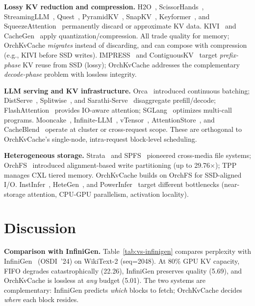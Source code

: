 \documentclass[conference]{IEEEtran}
\begin{document}
\textbf{Lossy KV reduction and compression.}
H2O~\cite{h2o}, ScissorHands~\cite{scissorhands}, StreamingLLM~\cite{streamingllm}, Quest~\cite{quest}, PyramidKV~\cite{pyramidkv}, SnapKV~\cite{snapkv}, Keyformer~\cite{keyformer}, and SqueezeAttention~\cite{squeezeattention} permanently discard or approximate KV data. KIVI~\cite{kivi} and CacheGen~\cite{cachegen} apply quantization/compression. All trade quality for memory; OrchKvCache \emph{migrates} instead of discarding, and can compose with compression (e.g., KIVI before SSD writes). IMPRESS~\cite{impress} and ContiguousKV~\cite{contiguouskv} target \emph{prefix-phase} KV reuse from SSD (lossy); OrchKvCache addresses the complementary \emph{decode-phase} problem with lossless integrity.

\textbf{LLM serving and KV infrastructure.}
Orca~\cite{orca} introduced continuous batching; DistServe~\cite{distserve}, Splitwise~\cite{splitwise}, and Sarathi-Serve~\cite{sarathi} disaggregate prefill/decode; FlashAttention~\cite{flashattn,flashattn2} provides IO-aware attention; SGLang~\cite{sglang} optimizes multi-call programs. Mooncake~\cite{mooncake}, Infinite-LLM~\cite{infinitellm}, vTensor~\cite{vtensor}, AttentionStore~\cite{attentionstore}, and CacheBlend~\cite{cacheblend} operate at cluster or cross-request scope. These are orthogonal to OrchKvCache's single-node, intra-request block-level scheduling.

\textbf{Heterogeneous storage.}
Strata~\cite{strata} and SPFS~\cite{spfs} pioneered cross-media file systems; OrchFS~\cite{orchfs} introduced alignment-based write partitioning (up to 29.76$\times$); TPP~\cite{tpp} manages CXL tiered memory. OrchKvCache builds on OrchFS for SSD-aligned I/O. InstInfer~\cite{instinfer}, HeteGen~\cite{hetegen}, and PowerInfer~\cite{powerinfer} target different bottlenecks (near-storage attention, CPU-GPU parallelism, activation locality).

\section{Discussion}
\label{sec:discussion}

\textbf{Comparison with InfiniGen.}
Table~\ref{tab:vs-infinigen} compares perplexity with InfiniGen~\cite{infinigen} (OSDI~'24) on WikiText-2 (seq=2048). At 80\% GPU KV capacity, FIFO degrades catastrophically (22.26), InfiniGen preserves quality (5.69), and OrchKvCache is lossless at \emph{any} budget (5.01). The two systems are complementary: InfiniGen predicts \emph{which} blocks to fetch; OrchKvCache decides \emph{where} each block resides.
\end{document}
